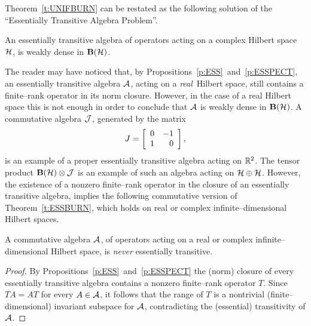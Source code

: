 \medskip

Theorem~\ref{t:UNIFBURN} can be restated as the following solution of the
``Essentially Transitive Algebra Problem''.

\begin{thm}\label{t:ESSBURN}
An essentially transitive algebra of operators acting on a complex Hilbert
space ${\cal H}$, is weakly dense in $\mathbf B(\cal H)$.
\end{thm}

\begin{rem}
The reader may have noticed that, by
Propositions~\ref{p:ESS}~and~\ref{p:ESSPECT}, an essentially transitive
algebra ${\cal A}$, acting on a {\em real}\, Hilbert space, still contains a
finite--rank operator in its norm closure. However, in the case of a real
Hilbert space this is not enough in order to conclude that ${\cal A}$ is weakly
dense in $\mathbf B(\cal H)$. A commutative algebra $\cal{J}$, generated by the matrix
\[ J= \left[
        \begin{array}{r r}
          0 & -1 \\
          1 &  0
        \end{array}
  \right], \]
is an example of a proper essentially transitive algebra acting on $\mathbb R^2$.
The tensor product $\mathbf B(\cal H)\otimes\cal{J}$ is an example of such an algebra
acting on ${\cal H}\oplus{\cal H}$. However, the existence of a nonzero finite--rank
operator in the closure of an essentially transitive algebra, implies the
following commutative version of Theorem~\ref{t:ESSBURN}, which holds on real
or complex infinite--dimensional Hilbert spaces.
\end{rem}

\medskip

\begin{thm}\label{t:COMBURN}
A commutative algebra ${\cal A}$, of operators acting on a real or complex
infinite--dimensional Hilbert space, is {\em never} essentially transitive.
\end{thm}

\begin{proof}
By Propositions~\ref{p:ESS}~and~\ref{p:ESSPECT} the (norm) closure of every
essentially transitive algebra contains a nonzero finite--rank operator $T$.
Since $T{}A=A{}T$ for every $A\in{\cal A}$, it follows that the range of $T$ is a
nontrivial (finite--dimensional) invariant subspace for ${\cal A}$, contradicting
the (essential) transitivity of ${\cal A}$.
\end{proof}

